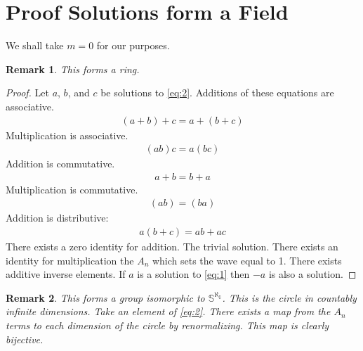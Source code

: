 \documentclass[10pt, oneside]{article}
\newtheorem{remark}{Remark}
\begin{document}
  \section{Proof Solutions form a Field}
  We shall take $m=0$ for our purposes.
  \begin{remark}
      This forms a ring.
  \end{remark}
  \begin{proof}
      Let $a$, $b$, and $c$ be solutions to \ref{eq:2}.
      Additions of these equations are associative.
      \begin{align*}
          (a+b)+c=a+(b+c)
      \end{align*}
      Multiplication is associative.
      \begin{align*}
          (a b) c = a (b c)
      \end{align*}
      Addition is commutative.
      \begin{align*}
          a + b = b + a
      \end{align*}
      Multiplication is commutative.
      \begin{align*}
          (a b) = (b a)
      \end{align*}
      Addition is distributive:
      \begin{align*}
          a (b + c) = ab + ac
      \end{align*}
      There exists a zero identity for addition. The trivial solution.
      There exists an identity for multiplication the $A_n$ which sets the wave equal to 1.
      There exists additive inverse elements. If $a$ is a solution to \ref{eq:1} then $-a$ is also a solution.
  \end{proof}
  \begin{remark}
      This forms a group isomorphic to $\mathbb{S^{\aleph_0}}$. This is the circle in countably infinite dimensions. Take an element of \ref{eq:2}. There exists a map from the $A_n$ terms to each dimension of the circle by renormalizing. This map is clearly bijective.
  \end{remark}
\end{document}
